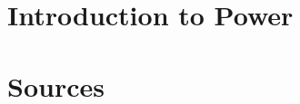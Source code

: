 \documentclass{article}
\begin{document}
\tableofcontents
\newpage

\section{Introduction to Power}


\newpage
\section{Sources}

\end{document}
